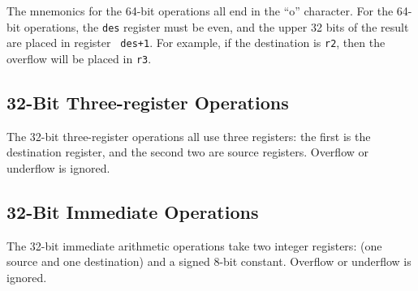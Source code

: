 The mnemonics for the 64-bit operations all end in the ``o''
character.  For the 64-bit operations, the {\tt des} register must be
even, and the upper 32 bits of the result are placed in register {\tt
des+1}.  For example, if the destination is {\tt r2}, then the
overflow will be placed in {\tt r3}.

\subsection{32-Bit Three-register Operations}

The 32-bit three-register operations all use three registers:  the
first is the destination register, and the second two are source
registers.  Overflow or underflow is ignored.

\begin{description}

\item	{}
\item	{}
\item	{}
\item	{}
\item	{}
\item	{}
\item	{}
\item	{}
\item	{}
\item	{}
\item	{}
\item	{}

\end{description}

\subsection{32-Bit Immediate Operations}

The 32-bit immediate arithmetic operations take two integer registers: 
(one source and one destination) and a signed 8-bit constant.  Overflow or underflow is ignored.

\begin{description}

\item {}
\item {}
\item {}
\item {}
\item {}
\item	{}
\item	{}
\item	{}

\end{description}

